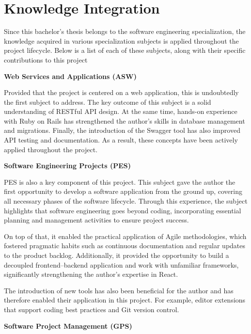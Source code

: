 \section{Knowledge Integration}

Since this bachelor's thesis belongs to the software engineering specialization, the knowledge acquired in various specialization subjects is applied throughout the project lifecycle. Below is a list of each of these subjects, along with their specific contributions to this project

\vspace{0.2cm}
\textbf{Web Services and Applications (ASW)}
\vspace{-0.1cm}

Provided that the project is centered on a web application, this is undoubtedly the first subject to address. The key outcome of this subject is a solid understanding of RESTful API design. At the same time, hands-on experience with Ruby on Rails has strengthened the author's skills in database management and migrations. Finally, the introduction of the Swagger tool has also improved API testing and documentation. As a result, these concepts have been actively applied throughout the project.

\vspace{0.2cm}
\textbf{Software Engineering Projects (PES)}
\vspace{-0.1cm}

PES is also a key component of this project. This subject gave the author the first opportunity to develop a software application from the ground up, covering all necessary phases of the software lifecycle. Through this experience, the subject highlights that software engineering goes beyond coding, incorporating essential planning and management activities to ensure project success.

On top of that, it enabled the practical application of Agile methodologies, which fostered pragmatic habits such as continuous documentation and regular updates to the product backlog. Additionally, it provided the opportunity to build a decoupled frontend–backend application and work with unfamiliar frameworks, significantly strengthening the author's expertise in React. 

The introduction of new tools has also been beneficial for the author and has therefore enabled their application in this project. For example, editor extensions that support coding best practices and Git version control.

\vspace{0.2cm}
\textbf{Software Project Management (GPS)}
\vspace{-0.1cm}

